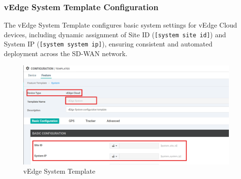 \documentclass[12pt,english]{report}
\begin{document}
\subsubsection{vEdge System Template Configuration}
The vEdge System Template configures basic system settings for vEdge Cloud devices, including dynamic assignment of Site ID (\texttt{[system site id]}) and System IP (\texttt{[system system ip]}), ensuring consistent and automated deployment across the SD-WAN network.
\begin{figure}[H]
    \centering
    \includegraphics[width= 1 \textwidth]{chapitre 3/template/1.png}
    \caption{vEdge System Template}
    \label{vEdge System Template}
\end{figure}
\end{document}
